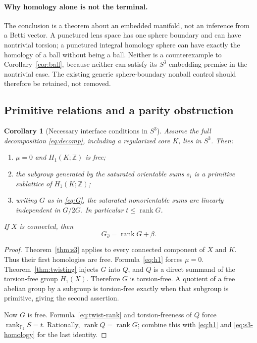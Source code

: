 \documentclass[11pt]{article}
\newtheorem{corollary}[theorem]{Corollary}
\theoremstyle{definition}
\theoremstyle{remark}
\newcommand{\Z}{\mathbb Z}
\newcommand{\F}{\mathbb F_2}
\newcommand{\rank}{\operatorname{rank}}
\begin{document}
\paragraph{Why homology alone is not the terminal.}
The conclusion is a theorem about an embedded manifold, not an inference
from a Betti vector. A punctured lens space has one sphere boundary and can
have nontrivial torsion; a punctured integral homology sphere can have exactly
the homology of a ball without being a ball. Neither is a counterexample to
Corollary~\ref{cor:ball}, because neither can satisfy its $S^3$ embedding
premise in the nontrivial case. The existing generic sphere-boundary nonball
control should therefore be retained, not removed.

\subsection{Primitive relations and a parity obstruction}
\begin{corollary}[Necessary interface conditions in $S^3$]
\label{cor:primitive}
Assume the full decomposition \eqref{eq:decomp}, including a regularized
core $K$, lies in $S^3$. Then:
\begin{enumerate}
\item $\mu=0$ and $H_1(K;\Z)$ is free;
\item the subgroup generated by the saturated orientable sums $s_i$ is a
primitive sublattice of $H_1(K;\Z)$;
\item writing $G$ as in \eqref{eq:G}, the saturated nonorientable sums are
linearly independent in $G/2G$. In particular $t\leq\rank G$.
\end{enumerate}
If $X$ is connected, then
\begin{equation}
 G_\partial=\rank G+\beta.
 \label{eq:s3-rank}
\end{equation}
\end{corollary}
\begin{proof}
Theorem~\ref{thm:s3} applies to every connected component of $X$ and $K$.
Thus their first homologies are free. Formula~\eqref{eq:h1} forces $\mu=0$.
Theorem~\ref{thm:twisting} injects $G$ into $Q$, and $Q$ is a direct summand
of the torsion-free group $H_1(X)$. Therefore $G$ is torsion-free. A quotient
of a free abelian group by a subgroup is torsion-free exactly when that
subgroup is primitive, giving the second assertion.

Now $G$ is free. Formula~\eqref{eq:twist-rank} and torsion-freeness of $Q$
force $\rank_{\F}\overline S=t$. Rationally, $\rank Q=\rank G$; combine
this with \eqref{eq:h1} and \eqref{eq:s3-homology} for the last identity.
\end{proof}
\end{document}

